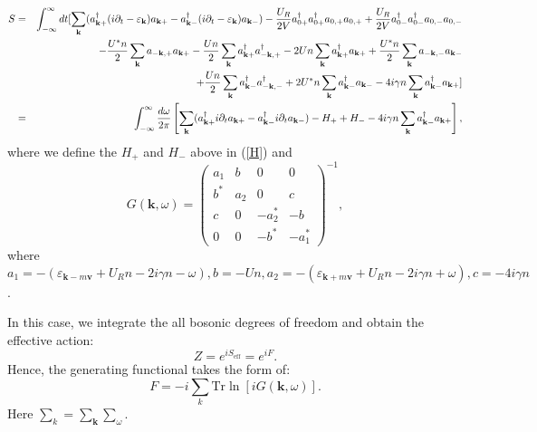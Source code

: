 \documentclass[aps,onecolumn,superscriptaddress,notitlepage,longbibliography]{revtex4-1}
\begin{document}
\begin{eqnarray}
  S & = &  \int_{- \infty}^{\infty} d t  [ \sum_{\mathbf{k}}
  (a^{\dagger}_{\mathbf{k}+} (i\partial_{t} - \varepsilon_{\mathbf{k}})
  a_{\mathbf{k}+} - a^{\dagger}_{\mathbf{k}-} (i\partial_{t} -
  \varepsilon_{\mathbf{k}}) a_{\mathbf{k}-}) - \frac{U_R}{2 V} a_{0
  +}^{\dagger} a_{0 +}^{\dagger} a_{0, +} a_{0, +} + \frac{U_R}{2 V} a_{0
  -}^{\dagger} a_{0 -}^{\dagger} a_{0, -} a_{0, -} \nonumber\\
  &  & - \frac{U^{\ast} n}{2} \sum_{\mathbf{k}} a_{-\mathbf{k}, +}
  a_{\mathbf{k}+} - \frac{U n}{2} \sum_{\mathbf{k}}
  a_{\mathbf{k}+}^{\dagger} a_{-\mathbf{k}, +}^{\dagger} - 2 U n
  \sum_{\mathbf{k}} a_{\mathbf{k}+}^{\dagger} a_{\mathbf{k}+} +
  \frac{U^{\ast} n}{2} \sum_{\mathbf{k}} a_{-\mathbf{k}, -}
  a_{\mathbf{k}-} \nonumber\\
  &  & + \frac{U n}{2} \sum_{\mathbf{k}} a_{\mathbf{k}-}^{\dagger}
  a_{-\mathbf{k}, -}^{\dagger} + 2 U^{\ast} n \sum_{\mathbf{k}}
  a_{\mathbf{k}-}^{\dagger} a_{\mathbf{k}-} - 4 i \gamma n
  \sum_{\mathbf{k}} a_{\mathbf{k}-}^{\dagger} a_{\mathbf{k}+}
  \large{\large{}] } \\
  & = & \int_{- \infty}^{\infty} \frac{d\omega}{2\pi} \left[ \sum_{\mathbf{k}}
  (a^{\dagger}_{\mathbf{k}+} i\partial_{t} a_{\mathbf{k}+} -
  a^{\dagger}_{\mathbf{k}-} i\partial_{t} a_{\mathbf{k}-}) - H_+ + H_- -
  4 i \gamma n \sum_{\mathbf{k}} a_{\mathbf{k}-}^{\dagger}
  a_{\mathbf{k}+} \right], 
\end{eqnarray}
where we define the $H_+$ and $H_-$ above in (\ref{H}) and
\begin{equation}
  G (\mathbf{k}, \omega) = \left(\begin{array}{cccc}
    a_1 & b & 0 & 0\\
    b^{\ast} & a_2 & 0 & c\\
    c & 0 & - a_2^{\ast} & - b\\
    0 & 0 & - b^{\ast} & - a_1^{\ast}
  \end{array}\right)^{- 1}, \label{Green2}
\end{equation}
where $a_1 = - (\varepsilon_{\mathbf{k}- m\mathbf{v}} + U_R n - 2 i
\gamma n - \omega), b = - U n, a_2 = - (\varepsilon_{\mathbf{k}+
m\mathbf{v}} + U_R n - 2 i \gamma n + \omega), c = - 4 i \gamma n$.

In this case, we integrate the all bosonic degrees of freedom and obtain the
effective action:
\begin{equation}
  Z = e^{i S_{\text{eff}}} = e^{i F}.
\end{equation}
Hence, the generating functional takes the form of:
\begin{equation}
  F = - i \sum_k \text{Tr} \ln [iG (\mathbf{k}, 
  \omega)].
\end{equation}
Here $\sum_k = \sum_{\mathbf{k}} \sum_{\omega}$.
\end{document}
